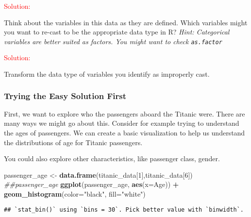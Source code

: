\documentclass[
]{article}
\newenvironment{Shaded}{\begin{snugshade}}{\end{snugshade}}
\newcommand{\CommentTok}[1]{\textcolor[rgb]{0.56,0.35,0.01}{\textit{#1}}}
\newcommand{\DataTypeTok}[1]{\textcolor[rgb]{0.13,0.29,0.53}{#1}}
\newcommand{\DecValTok}[1]{\textcolor[rgb]{0.00,0.00,0.81}{#1}}
\newcommand{\KeywordTok}[1]{\textcolor[rgb]{0.13,0.29,0.53}{\textbf{#1}}}
\newcommand{\NormalTok}[1]{#1}
\newcommand{\OperatorTok}[1]{\textcolor[rgb]{0.81,0.36,0.00}{\textbf{#1}}}
\newcommand{\StringTok}[1]{\textcolor[rgb]{0.31,0.60,0.02}{#1}}
\begin{document}
\textcolor{red}{Solution: }\emph{}

Think about the variables in this data as they are defined. Which
variables might you want to re-cast to be the appropriate data type in
R? \emph{Hint: Categorical variables are better suited as factors. You
might want to check \texttt{as.factor}}

\textcolor{red}{Solution: }\emph{}

Transform the data type of variables you identify as improperly cast.

\begin{Shaded}
\end{Shaded}

\hypertarget{trying-the-easy-solution-first}{%
\subsubsection{Trying the Easy Solution
First}\label{trying-the-easy-solution-first}}

First, we want to explore who the passengers aboard the Titanic were.
There are many ways we might go about this. Consider for example trying
to understand the ages of passengers. We can create a basic
visualization to help us understand the distributions of age for Titanic
passengers.

You could also explore other characteristics, like passenger class,
gender.

\begin{Shaded}
\begin{Highlighting}[]
\NormalTok{passenger_age <-}\StringTok{ }\KeywordTok{data.frame}\NormalTok{(titanic_data[}\DecValTok{1}\NormalTok{],titanic_data[}\DecValTok{6}\NormalTok{])}
\CommentTok{##passenger_age}
\KeywordTok{ggplot}\NormalTok{(passenger_age, }\KeywordTok{aes}\NormalTok{(}\DataTypeTok{x=}\NormalTok{Age)) }\OperatorTok{+}\StringTok{ }\KeywordTok{geom_histogram}\NormalTok{(}\DataTypeTok{color=}\StringTok{"black"}\NormalTok{, }\DataTypeTok{fill=}\StringTok{"white"}\NormalTok{)}
\end{Highlighting}
\end{Shaded}

\begin{verbatim}
## `stat_bin()` using `bins = 30`. Pick better value with `binwidth`.
\end{verbatim}
\end{document}
